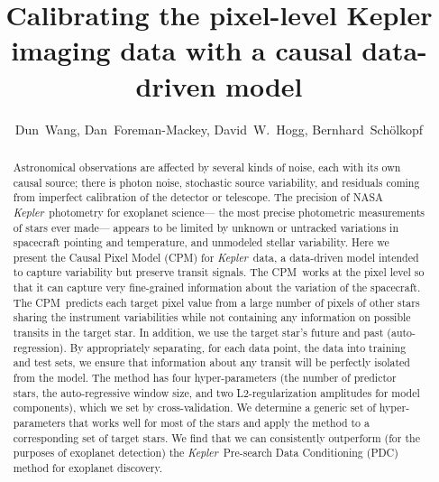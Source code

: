 \documentclass[12pt, preprint]{aastex}
\newcommand{\project}[1]{\textsl{#1}}
\newcommand{\Kepler}{\project{Kepler}}
\newcommand{\name}{CPM}
\begin{document}
\title{
  Calibrating the pixel-level Kepler imaging data with a causal data-driven model
 \\ 
}
\author{%
  Dun~Wang\altaffilmark{\ref{CCPP}},
  Dan~Foreman-Mackey\altaffilmark{\ref{CCPP}},
  David~W.~Hogg\altaffilmark{\ref{CCPP},\ref{CDS},\ref{MPIA},\ref{email}},
  Bernhard~Sch\"olkopf\altaffilmark{\ref{MPIIS}}
  }
\setcounter{address}{1}



\begin{abstract}
Astronomical observations are affected by several kinds of noise, each with its own causal source; 
there is photon noise, stochastic source variability, and residuals coming from imperfect calibration of the detector or telescope. 
The precision of NASA \Kepler\ photometry for exoplanet science---%
the most precise photometric measurements of stars ever made---%
appears to be limited by unknown or untracked variations in spacecraft pointing and temperature, 
and unmodeled stellar variability. Here we present the Causal Pixel Model (\name) for \Kepler\ data, 
a data-driven model intended to capture variability but preserve transit signals. 
The \name\ works at the pixel level so that
it can capture very fine-grained information about the variation of the spacecraft.
The \name\ predicts each target pixel value from a large number of pixels of other stars sharing the instrument variabilities 
while not containing any information on possible transits in the target star. In addition, we use the target star's future and past (auto-regression). 
By appropriately separating, for each data point, the data into training and test sets, 
  we ensure that information about any transit will be perfectly isolated from the model. 
The method has four hyper-parameters (the number of predictor stars, the auto-regressive window size, 
and two L2-regularization amplitudes for model components), which we set by cross-validation. 
We determine a generic set of hyper-parameters that works well for most of the stars and apply the method to a corresponding set of target stars. 
We find that we can consistently outperform (for the purposes of exoplanet detection) 
  the \Kepler\ Pre-search Data Conditioning (PDC) method for exoplanet discovery.

\end{abstract}
\end{document}
